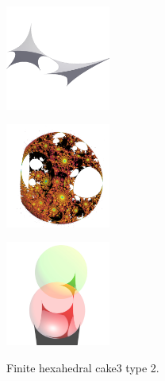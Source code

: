 \documentclass[suppldata, dvipdfmx]{interact}
\theoremstyle{plain}%
\theoremstyle{definition}
\theoremstyle{remark}
\theoremstyle{problemstyle}
\begin{document}
\begin{figure}[H]
 \begin{minipage}{0.5\textwidth}
  \begin{minipage}[t]{0.24\textwidth}
   \centering \includegraphics[width=1.35in, height=1.35in,
   keepaspectratio]{./img/sphairahedron/hexahedralCake3/sphairahedronFinite_b.jpg}
   \label{fig:cake3finiteSphairahedronType2}
  \end{minipage}
  \hspace*{\fill}
  \begin{minipage}[t]{0.24\textwidth}
   \centering
   \includegraphics[width=1.35in, height=1.35in,
   keepaspectratio]{./img/sphairahedron/hexahedralCake3/limitsetFinite_b.jpg}
   \label{fig:cake3finiteLimitsetType2}
  \end{minipage}
  \hspace*{\fill}
  \caption{Finite hexahedral cake3 type 2.}
  \label{fig:cake3finiteType2}
 \end{minipage}
 \hspace*{\fill}
 \begin{minipage}{0.5\textwidth}
  \begin{minipage}[t]{0.24\textwidth}
   \centering
   \includegraphics[width=1.35in, height=1.35in,
   keepaspectratio]{./img/sphairahedron/hexahedralCake3/sphairahedralPrismInf_b.jpg}
   \label{fig:cake3infiniteSphairahedronType2}

\end{minipage}
\end{minipage}
\end{figure}
\end{document}
